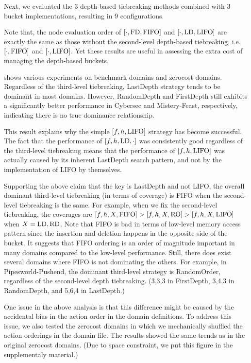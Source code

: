 Next, we evaluated the 3 depth-based tiebreaking methods combined with 3
bucket implementations, resulting in 9 configurations.

Note that, the node evaluation order of $[\cdot,\mbox{FD},\mbox{FIFO}]$ and $[\cdot,\mbox{LD},\mbox{LIFO}]$
are exactly the same as those without the second-level
depth-based tiebreaking, i.e.\ $[\cdot,\mbox{FIFO}]$ and $[\cdot,\mbox{LIFO}]$.
Yet these results are useful in assessing the extra cost of managing the
depth-based buckets.

 shows various experiments on benchmark domains and
zerocost domains. Regardless of the third-level tiebreaking, LastDepth
strategy tends to be dominant in most domains. However, RandomDepth and
FirstDepth still exhibits a significantly better performance in Cybersec
and Mistery-Feast, respectively, indicating there is no true dominance relationship.

This result explains why the simple $[f,h,\mbox{LIFO}]$ strategy has
become successful. The fact that the performance of $[f,h,\mbox{LD},\cdot]$
was consistently good regardless of the third-level tiebreaking means
that the performance of $[f,h,\mbox{LIFO}]$ was actually caused by its
inherent LastDepth search pattern, and not by the implementation of LIFO
by themselves.

Supporting the above claim that the key is LastDepth and not LIFO, the
overall dominant third-level tiebreaking (in terms of coverage) is FIFO
when the second-level tiebreaking is the same.  For example, when we fix
the second-level tiebreaking, the coverages are
$[f,h,X,\mbox{FIFO}]>[f,h,X,\mbox{RO}]>[f,h,X,\mbox{LIFO}]$ when $X=\mbox{LD},\mbox{RD}$.
% 
Note that FIFO is bad in terms of low-level memory access
pattern since the insertion and deletion happens in the opposite side of
the bucket. It suggests that FIFO ordering is an order of magnitude
important in many domains compared to the low-level performance.
% 
Still, there does exist several domains where FIFO is not dominating
the others.
For example, in Pipesworld-Pushend, the dominant third-level strategy is
RandomOrder, regardless of the second-level depth tiebreaking.
(3,3,3 in FirstDepth, 3,4,3 in RandomDepth, and 5,6,4 in LastDepth.)

% 

One issue in the above analysis is that this difference might
be caused by the accidental bias in the action order in the
domain definitions.
To address this issue, we also tested the zerocost domains
in which we mechanically shuffled the action orderings in the
domain file. The results showed the same trends as in the original
zerocost domains. (Due to space constraint, we put this figure in the
supplementaly material.)

